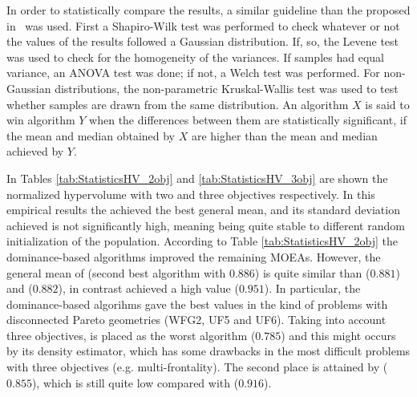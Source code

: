 %
In order to statistically compare the \HV{} results, a similar guideline than the proposed in~\cite{Joel:StatisticalTest} was used. 
%
First a Shapiro-Wilk test was performed to check whatever or not the values of the results followed a Gaussian distribution. 
%
If, so, the Levene test was used to check for the homogeneity of the variances. 
%
If samples had equal variance, an ANOVA test was done; if not, a Welch test was performed. 
%
For non-Gaussian distributions, the non-parametric Kruskal-Wallis test was used to test whether samples are drawn from the same distribution. 
%
An algorithm $X$ is said to win algorithm $Y$ when the differences between them are statistically significant, if the mean and median obtained by $X$ are higher than the mean and median achieved by $Y$.
%

In Tables \ref{tab:StatisticsHV_2obj} and \ref{tab:StatisticsHV_3obj} are shown the normalized hypervolume with two and three objectives respectively.
%
In this empirical results the \VSDMOEA{} achieved the best general mean, and its standard deviation achieved is not significantly high, meaning being quite stable to different random initialization of the population.
%
According to Table \ref{tab:StatisticsHV_2obj} the dominance-based algorithms improved the remaining MOEAs.
%
However, the general mean of \NSGAII{} (second best algorithm with $0.886$) is quite similar than \MOEAD{} ($0.881$) and \RMOEA{} ($0.882$), in contrast \VSDMOEA{} achieved a high \HV{} value ($0.951$).
%
In particular, the dominance-based algorihms gave the best values in the kind of problems with disconnected Pareto geometries (WFG2, UF5 and UF6).
%
Taking into account three objectives, \NSGAII{} is placed as the worst algorithm ($0.785$) and this might occurs by its density estimator, which has some drawbacks in the most difficult problems with three objectives (e.g. multi-frontality).
%
The second place is attained by \RMOEA{} ($0.855$), which is still quite low compared with \VSDMOEA{} ($0.916$).
%


